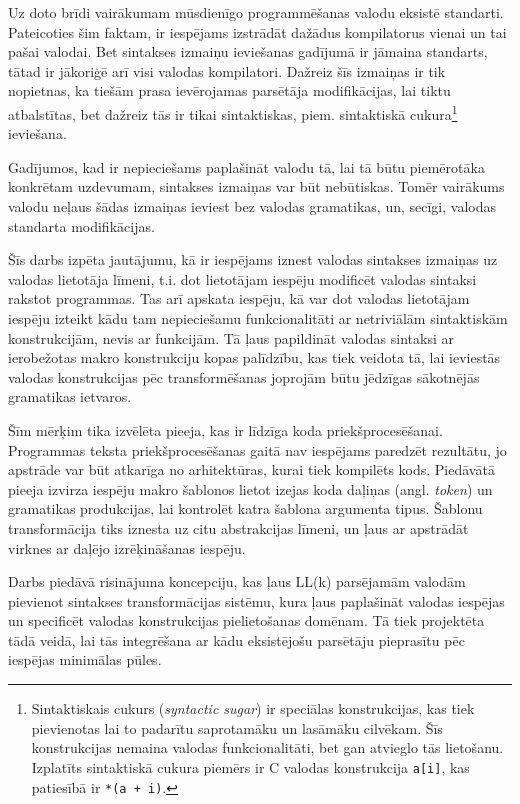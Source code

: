 Uz doto brīdi vairākumam mūsdienīgo programmēšanas valodu eksistē standarti. Pateicoties šim faktam, ir iespējams izstrādāt dažādus kompilatorus vienai un tai pašai valodai. Bet sintakses izmaiņu ieviešanas gadījumā ir jāmaina standarts, tātad ir jākoriģē arī visi valodas kompilatori. Dažreiz šīs izmaiņas ir tik nopietnas, ka tiešām prasa ievērojamas parsētāja modifikācijas, lai tiktu atbalstītas, bet dažreiz tās ir tikai sintaktiskas, piem. sintaktiskā cukura\footnote{Sintaktiskais cukurs (\emph{syntactic sugar}) ir speciālas konstrukcijas, kas tiek pievienotas lai to padarītu saprotamāku un lasāmāku cilvēkam. Šīs konstrukcijas nemaina valodas funkcionalitāti, bet gan atvieglo tās lietošanu. Izplatīts sintaktiskā cukura piemērs ir C valodas konstrukcija \texttt{a[i]}, kas patiesībā ir \texttt{*(a + i)}.} ieviešana.

Gadījumos, kad ir nepieciešams paplašināt valodu tā, lai tā būtu piemērotāka konkrētam uzdevumam, sintakses izmaiņas var būt nebūtiskas. Tomēr vairākums valodu neļaus šādas izmaiņas ieviest bez valodas gramatikas, un, secīgi, valodas standarta modifikācijas.

Šīs darbs izpēta jautājumu, kā ir iespējams iznest valodas sintakses izmaiņas uz valodas lietotāja līmeni, t.i. dot lietotājam iespēju modificēt valodas sintaksi rakstot programmas. Tas arī apskata iespēju, kā var dot valodas lietotājam iespēju izteikt kādu tam nepieciešamu funkcionalitāti ar netriviālām sintaktiskām konstrukcijām, nevis ar funkcijām. Tā ļaus papildināt valodas sintaksi ar ierobežotas makro konstrukciju kopas palīdzību, kas tiek veidota tā, lai ieviestās valodas konstrukcijas pēc transformēšanas joprojām būtu jēdzīgas sākotnējās gramatikas ietvaros.

Šīm mērķim tika izvēlēta pieeja, kas ir līdzīga koda priekšprocesēšanai. Programmas teksta priekšprocesēšanas gaitā nav iespējams paredzēt rezultātu, jo apstrāde var būt atkarīga no arhitektūras, kurai tiek kompilēts kods. Piedāvātā pieeja izvirza iespēju makro šablonos lietot izejas koda daļiņas (angl. \emph{token}) un gramatikas produkcijas, lai kontrolēt katra šablona argumenta tipus. Šablonu transformācija tiks iznesta uz citu abstrakcijas līmeni, un ļaus ar apstrādāt virknes ar daļējo izrēķināšanas iespēju.

Darbs piedāvā risinājuma koncepciju, kas ļaus LL(k) parsējamām valodām pievienot sintakses transformācijas sistēmu, kura ļaus paplašināt valodas iespējas un specificēt valodas konstrukcijas pielietošanas domēnam. Tā tiek projektēta tādā veidā, lai tās integrēšana ar kādu eksistējošu parsētāju pieprasītu pēc iespējas minimālas pūles.

